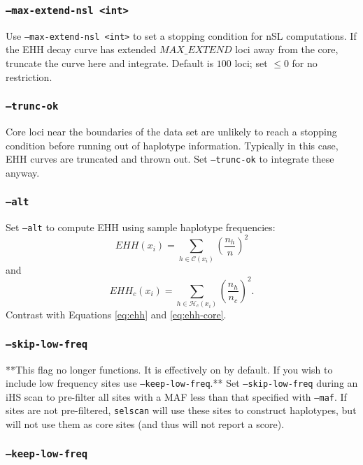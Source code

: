 \documentclass[12pt]{article}%
\begin{document}
\subsubsection{{\tt --max-extend-nsl <int>}}

Use {\tt --max-extend-nsl <int>} to set a stopping condition for nSL computations.  If the EHH decay curve has extended $MAX\_EXTEND$ loci away from the core, truncate the curve here and integrate.  Default is $100$ loci; set $\le 0$ for no restriction.

\subsubsection{{\tt --trunc-ok}}

Core loci near the boundaries of the data set are unlikely to reach a stopping condition before running out of haplotype information.  Typically in this case, EHH curves are truncated and thrown out. Set {\tt --trunc-ok} to integrate these anyway.

\subsubsection{{\tt --alt}}

Set {\tt --alt} to compute EHH using sample haplotype frequencies:
\begin{equation}
EHH(x_i) = \sum_{h \in \mathcal{C}(x_i)} \left(\frac{n_h}{n}\right)^2
\end{equation}
and
\begin{equation}
EHH_c(x_i) = \sum_{h \in \mathcal{H}_c(x_i)} \left(\frac{n_h}{n_c}\right)^2.
\end{equation}
Contrast with Equations \ref{eq:ehh} and \ref{eq:ehh-core}.

\subsubsection{{\tt --skip-low-freq}}

**This flag no longer functions.  It is effectively on by default.  If you wish to include low frequency sites use {\tt --keep-low-freq}.** Set {\tt --skip-low-freq} during an iHS scan to pre-filter all sites with a MAF less than that specified with {\tt --maf}.  If sites are not pre-filtered, {\tt selscan} will use these sites to construct haplotypes, but will not use them as core sites (and thus will not report a score).

\subsubsection{{\tt --keep-low-freq}}
\end{document}
